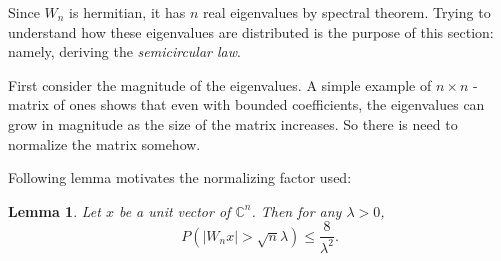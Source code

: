 \documentclass[12pt,a4paper,leqno]{report}
\newcommand{\C}{\mathbb{C}}
\theoremstyle{plain}
\newtheorem{lem}[equation]{Lemma}
\theoremstyle{definition}
\theoremstyle{remark}
\begin{document}
Since $W_n$ is hermitian, it has $n$ real eigenvalues by spectral theorem.
Trying to understand how these eigenvalues are distributed is the purpose of this section: namely, deriving the \emph{semicircular law}.

First consider the magnitude of the eigenvalues. A simple example of $n \times n$ -matrix of ones shows that even with bounded coefficients, the eigenvalues can grow in magnitude as the size of the matrix increases. So there is need to normalize the matrix somehow.

Following lemma motivates the normalizing factor used:

\begin{lem}
Let $x$ be a unit vector of $\C^n$. Then for any $\lambda > 0$, 
\begin{equation*}
P(|W_nx|>\sqrt{n}\lambda) \leq \frac{8}{\lambda^2}.
\end{equation*}
\end{lem}
\end{document}
